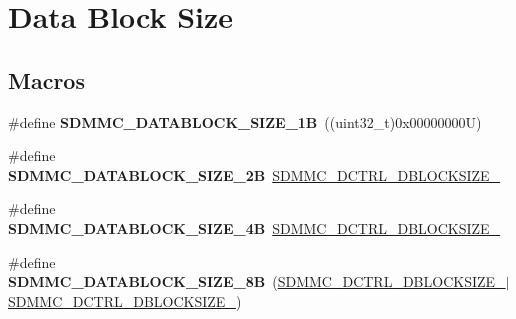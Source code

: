 \hypertarget{group___s_d_m_m_c___l_l___data___block___size}{}\section{Data Block Size}
\label{group___s_d_m_m_c___l_l___data___block___size}
\subsection*{Macros}
\begin{DoxyCompactItemize}
\item 
\mbox{\label{group___s_d_m_m_c___l_l___data___block___size_gae28ad8d55b2283efdd5970824c53a174}} 
\#define {\bfseries S\+D\+M\+M\+C\+\_\+\+D\+A\+T\+A\+B\+L\+O\+C\+K\+\_\+\+S\+I\+Z\+E\+\_\+1B}~((uint32\+\_\+t)0x00000000\+U)
\item 
\mbox{\label{group___s_d_m_m_c___l_l___data___block___size_gab4b288fbcd0298752d05f77d8e9c660d}} 
\#define {\bfseries S\+D\+M\+M\+C\+\_\+\+D\+A\+T\+A\+B\+L\+O\+C\+K\+\_\+\+S\+I\+Z\+E\+\_\+2B}~\mbox{\hyperlink{group___peripheral___registers___bits___definition_gafacd555221e3b669839f2bdc24531c06}{S\+D\+M\+M\+C\+\_\+\+D\+C\+T\+R\+L\+\_\+\+D\+B\+L\+O\+C\+K\+S\+I\+Z\+E\+\_}}
\item 
\mbox{\label{group___s_d_m_m_c___l_l___data___block___size_ga21e108e988ffaf22e5b01f70428c436c}} 
\#define {\bfseries S\+D\+M\+M\+C\+\_\+\+D\+A\+T\+A\+B\+L\+O\+C\+K\+\_\+\+S\+I\+Z\+E\+\_\+4B}~\mbox{\hyperlink{group___peripheral___registers___bits___definition_gaed289ccb613a89c9fbada5cd541b88c4}{S\+D\+M\+M\+C\+\_\+\+D\+C\+T\+R\+L\+\_\+\+D\+B\+L\+O\+C\+K\+S\+I\+Z\+E\+\_}}
\item 
\mbox{\label{group___s_d_m_m_c___l_l___data___block___size_ga713499118e20b30c9f1e7126f4dce074}} 
\#define {\bfseries S\+D\+M\+M\+C\+\_\+\+D\+A\+T\+A\+B\+L\+O\+C\+K\+\_\+\+S\+I\+Z\+E\+\_\+8B}~(\mbox{\hyperlink{group___peripheral___registers___bits___definition_gafacd555221e3b669839f2bdc24531c06}{S\+D\+M\+M\+C\+\_\+\+D\+C\+T\+R\+L\+\_\+\+D\+B\+L\+O\+C\+K\+S\+I\+Z\+E\+\_}}$\vert$\mbox{\hyperlink{group___peripheral___registers___bits___definition_gaed289ccb613a89c9fbada5cd541b88c4}{S\+D\+M\+M\+C\+\_\+\+D\+C\+T\+R\+L\+\_\+\+D\+B\+L\+O\+C\+K\+S\+I\+Z\+E\+\_}})

\end{DoxyCompactItemize}
